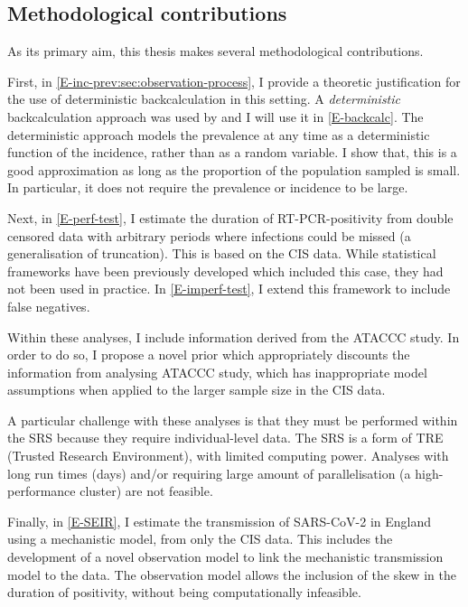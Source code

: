 \documentclass[thesis.tex]{subfiles}
\begin{document}
\subsection{Methodological contributions}

As its primary aim, this thesis makes several methodological contributions.

First, in \cref{E-inc-prev:sec:observation-process}, I provide a theoretic justification for the use of deterministic backcalculation in this setting.
A \emph{deterministic} backcalculation approach was used by \textcite{abbottCISincidence} and I will use it in \cref{E-backcalc}.
The deterministic approach models the prevalence at any time as a deterministic function of the incidence, rather than as a random variable.
I show that, this is a good approximation as long as the proportion of the population sampled is small.
In particular, it does not require the prevalence or incidence to be large.

Next, in \cref{E-perf-test}, I estimate the duration of RT-PCR-positivity from double censored data with arbitrary periods where infections could be missed (a generalisation of truncation).
This is based on the CIS data.
While statistical frameworks have been previously developed which included this case, they had not been used in practice.
In \cref{E-imperf-test}, I extend this framework to include false negatives.

Within these analyses, I include information derived from the ATACCC study.
In order to do so, I propose a novel prior which appropriately discounts the information from analysing ATACCC study, which has inappropriate model assumptions when applied to the larger sample size in the CIS data.

A particular challenge with these analyses is that they must be performed within the SRS because they require individual-level data.
The SRS is a form of TRE (Trusted Research Environment), with limited computing power.
Analyses with long run times (\ie days) and/or requiring large amount of parallelisation (\eg a high-performance cluster) are not feasible.

Finally, in \cref{E-SEIR}, I estimate the transmission of SARS-CoV-2 in England using a mechanistic model, from only the CIS data.
This includes the development of a novel observation model to link the mechanistic transmission model to the data.
The observation model allows the inclusion of the skew in the duration of positivity, without being computationally infeasible.
\end{document}
